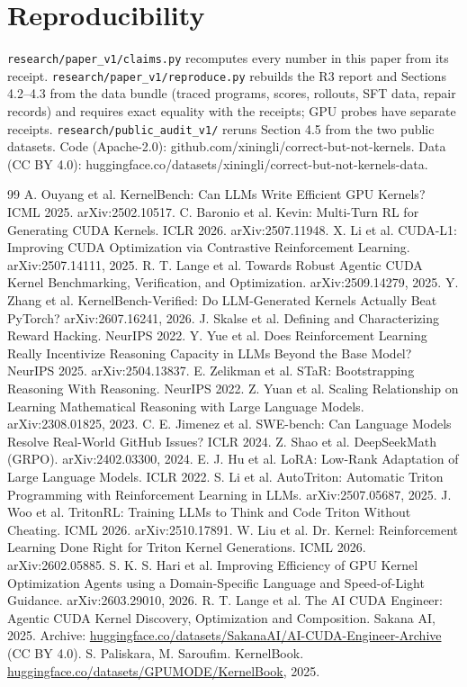 \documentclass[11pt]{article}
\begin{document}
\section{Reproducibility}\label{reproducibility}

\texttt{research/\allowbreak{}paper\_\allowbreak{}v1/\allowbreak{}claims.\allowbreak{}py} recomputes every number in this paper from its receipt.
\texttt{research/\allowbreak{}paper\_\allowbreak{}v1/\allowbreak{}reproduce.\allowbreak{}py} rebuilds the R3 report and Sections 4.2--4.3 from the
data bundle (traced programs, scores, rollouts, SFT data, repair records) and requires
exact equality with the receipts; GPU probes have separate receipts.
\texttt{research/\allowbreak{}public\_\allowbreak{}audit\_\allowbreak{}v1/} reruns Section 4.5 from the two public datasets. Code (Apache-2.0):
github.com/xiningli/correct-but-not-kernels. Data (CC BY 4.0):
huggingface.co/datasets/xiningli/correct-but-not-kernels-data.

\begin{thebibliography}{99}
\small
{} A. Ouyang et al. KernelBench: Can LLMs Write Efficient GPU Kernels? ICML 2025. arXiv:2502.10517.
 C. Baronio et al. Kevin: Multi-Turn RL for Generating CUDA Kernels. ICLR 2026. arXiv:2507.11948.
 X. Li et al. CUDA-L1: Improving CUDA Optimization via Contrastive Reinforcement Learning. arXiv:2507.14111, 2025.
 R. T. Lange et al. Towards Robust Agentic CUDA Kernel Benchmarking, Verification, and Optimization. arXiv:2509.14279, 2025.
 Y. Zhang et al. KernelBench-Verified: Do LLM-Generated Kernels Actually Beat PyTorch? arXiv:2607.16241, 2026.
 J. Skalse et al. Defining and Characterizing Reward Hacking. NeurIPS 2022.
 Y. Yue et al. Does Reinforcement Learning Really Incentivize Reasoning Capacity in LLMs Beyond the Base Model? NeurIPS 2025. arXiv:2504.13837.
 E. Zelikman et al. STaR: Bootstrapping Reasoning With Reasoning. NeurIPS 2022.
 Z. Yuan et al. Scaling Relationship on Learning Mathematical Reasoning with Large Language Models. arXiv:2308.01825, 2023.
 C. E. Jimenez et al. SWE-bench: Can Language Models Resolve Real-World GitHub Issues? ICLR 2024.
 Z. Shao et al. DeepSeekMath (GRPO). arXiv:2402.03300, 2024.
 E. J. Hu et al. LoRA: Low-Rank Adaptation of Large Language Models. ICLR 2022.
 S. Li et al. AutoTriton: Automatic Triton Programming with Reinforcement Learning in LLMs. arXiv:2507.05687, 2025.
 J. Woo et al. TritonRL: Training LLMs to Think and Code Triton Without Cheating. ICML 2026. arXiv:2510.17891.
 W. Liu et al. Dr. Kernel: Reinforcement Learning Done Right for Triton Kernel Generations. ICML 2026. arXiv:2602.05885.
 S. K. S. Hari et al. Improving Efficiency of GPU Kernel Optimization Agents using a Domain-Specific Language and Speed-of-Light Guidance. arXiv:2603.29010, 2026.
 R. T. Lange et al. The AI CUDA Engineer: Agentic CUDA Kernel Discovery, Optimization and Composition. Sakana AI, 2025. Archive: \url{huggingface.co/datasets/SakanaAI/AI-CUDA-Engineer-Archive} (CC BY 4.0).
 S. Paliskara, M. Saroufim. KernelBook. \url{huggingface.co/datasets/GPUMODE/KernelBook}, 2025.
\end{thebibliography}
\end{document}
